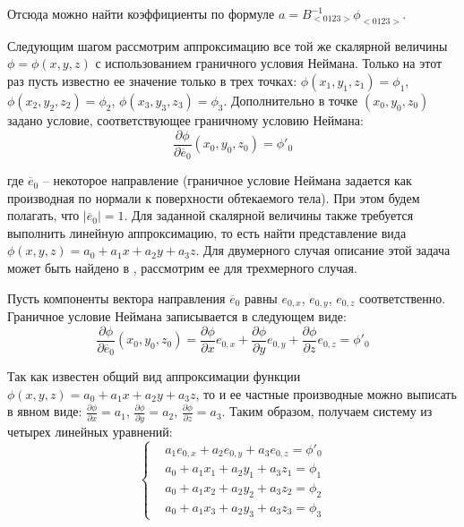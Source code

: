 Отсюда можно найти коэффициенты по формуле $a = B_{<0123>}^{-1}\phi_{<0123>}$.

Следующим шагом рассмотрим аппроксимацию все той же скалярной величины $\phi = \phi(x, y, z)$ с использованием граничного условия Неймана.
Только на этот раз пусть известно ее значение только в трех точках: $\phi(x_1, y_1, z_1) = \phi_1$, $\phi(x_2, y_2, z_2) = \phi_2$, $\phi(x_3, y_3, z_3) = \phi_3$.
Дополнительно в точке $(x_0, y_0, z_0)$ задано условие, соответствующее граничному условию Неймана:
\begin{equation}
	\frac{\partial{\phi}}{\partial{\overline{e}_0}}(x_0, y_0, z_0) = \phi'_0
\end{equation}

где $\overline{e}_0$ -- некоторое направление (граничное условие Неймана задается как производная по нормали к поверхности обтекаемого тела).
При этом будем полагать, что $|\overline{e}_0| = 1$.
Для заданной скалярной величины также требуется выполнить линейную аппроксимацию, то есть найти представление вида $\phi(x, y, z) = a_0 + a_1x + a_2y + a_3z$.
Для двумерного случая описание этой задача может быть найдено в \cite{Tseng2003Immersed}, рассмотрим ее для трехмерного случая.

Пусть компоненты вектора направления $\overline{e}_0$ равны $e_{0,x}$, $e_{0,y}$, $e_{0,z}$ соответственно.
Граничное условие Неймана записывается в следующем виде:
\begin{equation}
	\frac{\partial{\phi}}{\partial{\overline{e}_0}}(x_0, y_0, z_0) = \frac{\partial{\phi}}{\partial{x}}e_{0,x} + \frac{\partial{\phi}}{\partial{y}}e_{0,y} + \frac{\partial{\phi}}{\partial{z}}e_{0,z} = \phi'_0
\end{equation}

Так как известен общий вид аппроксимации функции $\phi(x, y, z) = a_0 + a_1x + a_2y + a_3z$, то и ее частные производные можно выписать в явном виде: $\frac{\partial{\phi}}{\partial{x}} = a_1$, $\frac{\partial{\phi}}{\partial{y}} = a_2$, $\frac{\partial{\phi}}{\partial{z}} = a_3$.
Таким образом, получаем систему из четырех линейных уравнений:
\begin{equation}\label{eqn:text_1_ibm_sys1}
	\left\{
		\begin{aligned}
			& a_1e_{0,x} + a_2e_{0,y} + a_3e_{0,z} = \phi'_0 \\
			& a_0 + a_1x_1 + a_2y_1 + a_3z_1 = \phi_1 \\
			& a_0 + a_1x_2 + a_2y_2 + a_3z_2 = \phi_2 \\
			& a_0 + a_1x_3 + a_2y_3 + a_3z_3 = \phi_3
		\end{aligned}
	\right.
\end{equation}

